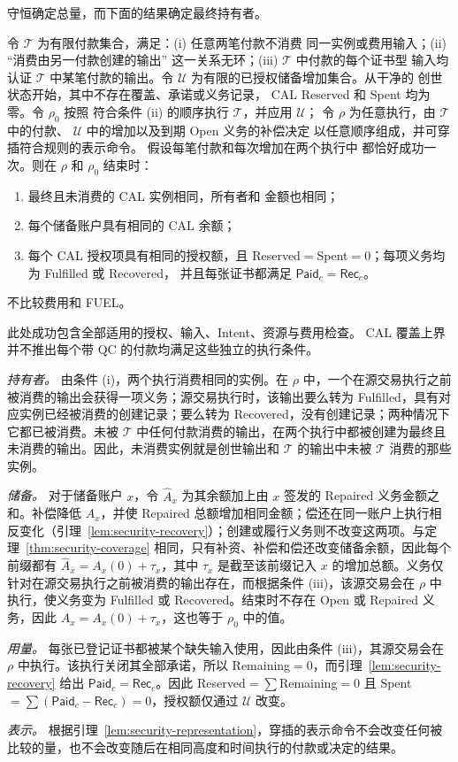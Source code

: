 守恒确定总量，而下面的结果确定最终持有者。

\begin{theorem}
\label{thm:security-neutrality}
令 $\mathcal T$ 为有限付款集合，满足：(i) 任意两笔付款不消费
同一实例或费用输入；(ii) ``消费由另一付款创建的输出''
这一关系无环；(iii) $\mathcal T$ 中付款的每个证书型
输入均认证 $\mathcal T$ 中某笔付款的输出。令
$\mathcal U$ 为有限的已授权储备增加集合。从干净的
创世状态开始，其中不存在覆盖、承诺或义务记录，
CAL Reserved 和 Spent 均为零。令 $\rho_0$ 按照
符合条件 (ii) 的顺序执行 $\mathcal T$，并应用 $\mathcal U$；
令 $\rho$ 为任意执行，由 $\mathcal T$ 中的付款、
$\mathcal U$ 中的增加以及到期 Open 义务的补偿决定
以任意顺序组成，并可穿插符合规则的表示命令。
假设每笔付款和每次增加在两个执行中
都恰好成功一次。则在 $\rho$ 和 $\rho_0$ 结束时：
\begin{enumerate}
\item 最终且未消费的 CAL 实例相同，所有者和
金额也相同；
\item 每个储备账户具有相同的 CAL 余额；
\item 每个 CAL 授权项具有相同的授权额，且
Reserved$=$Spent$=0$；每项义务均为 Fulfilled 或 Recovered，
并且每张证书都满足 $\mathsf{Paid}_c=\mathsf{Rec}_c$。
\end{enumerate}
不比较费用和 FUEL。
\end{theorem}
此处成功包含全部适用的授权、输入、Intent、资源与费用检查。
CAL 覆盖上界并不推出每个带 QC 的付款均满足这些独立的执行条件。
\begin{IEEEproof}
\emph{持有者。} 由条件 (i)，两个执行消费相同的实例。在 $\rho$ 中，一个在源交易执行之前被消费的输出会获得一项义务；源交易执行时，该输出要么转为 Fulfilled，具有对应实例已经被消费的创建记录；要么转为 Recovered，没有创建记录；两种情况下它都已被消费。未被 $\mathcal T$ 中任何付款消费的输出，在两个执行中都被创建为最终且未消费的输出。因此，未消费实例就是创世输出和 $\mathcal T$ 的输出中未被 $\mathcal T$ 消费的那些实例。

\emph{储备。} 对于储备账户 $x$，令 $\hat A_x$ 为其余额加上由 $x$ 签发的 Repaired 义务金额之和。补偿降低 $A_x$，并使 Repaired 总额增加相同金额；偿还在同一账户上执行相反变化（引理~\ref{lem:security-recovery}）；创建或履行义务则不改变这两项。与定理~\ref{thm:security-coverage} 相同，只有补资、补偿和偿还改变储备余额，因此每个前缀都有 $\hat A_x=A_x(0)+\tau_x$，其中 $\tau_x$ 是截至该前缀记入 $x$ 的增加总额。义务仅针对在源交易执行之前被消费的输出存在，而根据条件 (iii)，该源交易会在 $\rho$ 中执行，使义务变为 Fulfilled 或 Recovered。结束时不存在 Open 或 Repaired 义务，因此 $A_x=A_x(0)+\tau_x$，这也等于 $\rho_0$ 中的值。

\emph{用量。} 每张已登记证书都被某个缺失输入使用，因此由条件 (iii)，其源交易会在 $\rho$ 中执行。该执行关闭其全部承诺，所以 Remaining$=0$，而引理~\ref{lem:security-recovery} 给出 $\mathsf{Paid}_c=\mathsf{Rec}_c$。因此 Reserved$=\sum$Remaining$=0$ 且 Spent$=\sum(\mathsf{Paid}_c-\mathsf{Rec}_c)=0$，授权额仅通过 $\mathcal U$ 改变。

\emph{表示。} 根据引理~\ref{lem:security-representation}，穿插的表示命令不会改变任何被比较的量，也不会改变随后在相同高度和时间执行的付款或决定的结果。
\end{IEEEproof}

